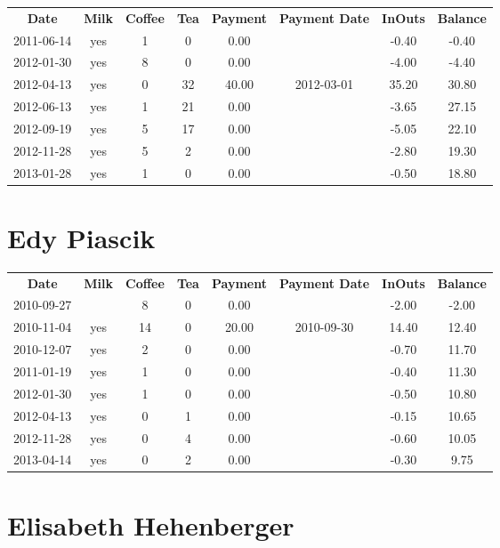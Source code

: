 \begin{center}
\begin{tabular}{cccccccc}
\textbf{Date} & \textbf{Milk} & \textbf{Coffee} & \textbf{Tea} & \textbf{Payment} & \textbf{Payment Date} & \textbf{InOuts} & \textbf{Balance} \\
2011-06-14 & yes & 1 &  0 &  0.00 &  & -0.40 & -0.40\\ 
2012-01-30 & yes & 8 &  0 &  0.00 &  & -4.00 & -4.40\\ 
2012-04-13 & yes & 0 & 32 & 40.00 & 2012-03-01 & 35.20 & 30.80\\ 
2012-06-13 & yes & 1 & 21 &  0.00 &  & -3.65 & 27.15\\ 
2012-09-19 & yes & 5 & 17 &  0.00 &  & -5.05 & 22.10\\ 
2012-11-28 & yes & 5 &  2 &  0.00 &  & -2.80 & 19.30\\ 
2013-01-28 & yes & 1 &  0 &  0.00 &  & -0.50 & 18.80
\end{tabular}
\end{center}

\section{Edy Piascik}

\begin{center}
\begin{tabular}{cccccccc}
\textbf{Date} & \textbf{Milk} & \textbf{Coffee} & \textbf{Tea} & \textbf{Payment} & \textbf{Payment Date} & \textbf{InOuts} & \textbf{Balance} \\
2010-09-27 &  &  8 & 0 &  0.00 &  & -2.00 & -2.00\\ 
2010-11-04 & yes & 14 & 0 & 20.00 & 2010-09-30 & 14.40 & 12.40\\ 
2010-12-07 & yes &  2 & 0 &  0.00 &  & -0.70 & 11.70\\ 
2011-01-19 & yes &  1 & 0 &  0.00 &  & -0.40 & 11.30\\ 
2012-01-30 & yes &  1 & 0 &  0.00 &  & -0.50 & 10.80\\ 
2012-04-13 & yes &  0 & 1 &  0.00 &  & -0.15 & 10.65\\ 
2012-11-28 & yes &  0 & 4 &  0.00 &  & -0.60 & 10.05\\ 
2013-04-14 & yes &  0 & 2 &  0.00 &  & -0.30 &  9.75
\end{tabular}
\end{center}

\section{Elisabeth Hehenberger}


